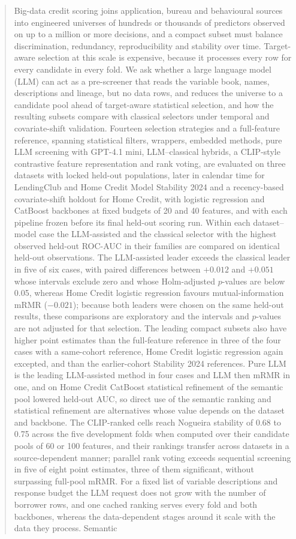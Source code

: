 \documentclass[final,5p,twocolumn]{elsarticle}
\begin{document}
\begin{frontmatter}
\begin{abstract}
Big-data credit scoring joins application, bureau and behavioural sources into engineered universes of hundreds or thousands of predictors observed on up to a million or more decisions, and a compact subset must balance discrimination, redundancy, reproducibility and stability over time. Target-aware selection at this scale is expensive, because it processes every row for every candidate in every fold. We ask whether a large language model (LLM) can act as a pre-screener that reads the variable book, names, descriptions and lineage, but no data rows, and reduces the universe to a candidate pool ahead of target-aware statistical selection, and how the resulting subsets compare with classical selectors under temporal and covariate-shift validation. Fourteen selection strategies and a full-feature reference, spanning statistical filters, wrappers, embedded methods, pure LLM screening with GPT-4.1 mini, LLM--classical hybrids, a CLIP-style contrastive feature representation and rank voting, are evaluated on three datasets with locked held-out populations, later in calendar time for LendingClub and Home Credit Model Stability 2024 and a recency-based covariate-shift holdout for Home Credit, with logistic regression and CatBoost backbones at fixed budgets of 20 and 40 features, and with each pipeline frozen before its final held-out scoring run. Within each dataset--model case the LLM-assisted and the classical selector with the highest observed held-out ROC-AUC in their families are compared on identical held-out observations. The LLM-assisted leader exceeds the classical leader in five of six cases, with paired differences between $+0.012$ and $+0.051$ whose intervals exclude zero and whose Holm-adjusted $p$-values are below 0.05, whereas Home Credit logistic regression favours mutual-information mRMR ($-0.021$); because both leaders were chosen on the same held-out results, these comparisons are exploratory and the intervals and $p$-values are not adjusted for that selection. The leading compact subsets also have higher point estimates than the full-feature reference in three of the four cases with a same-cohort reference, Home Credit logistic regression again excepted, and than the earlier-cohort Stability 2024 references. Pure LLM is the leading LLM-assisted method in four cases and LLM then mRMR in one, and on Home Credit CatBoost statistical refinement of the semantic pool lowered held-out AUC, so direct use of the semantic ranking and statistical refinement are alternatives whose value depends on the dataset and backbone. The CLIP-ranked cells reach Nogueira stability of 0.68 to 0.75 across the five development folds when computed over their candidate pools of 60 or 100 features, and their rankings transfer across datasets in a source-dependent manner; parallel rank voting exceeds sequential screening in five of eight point estimates, three of them significant, without surpassing full-pool mRMR. For a fixed list of variable descriptions and response budget the LLM request does not grow with the number of borrower rows, and one cached ranking serves every fold and both backbones, whereas the data-dependent stages around it scale with the data they process. Semantic 
\end{abstract}
\end{frontmatter}
\end{document}
